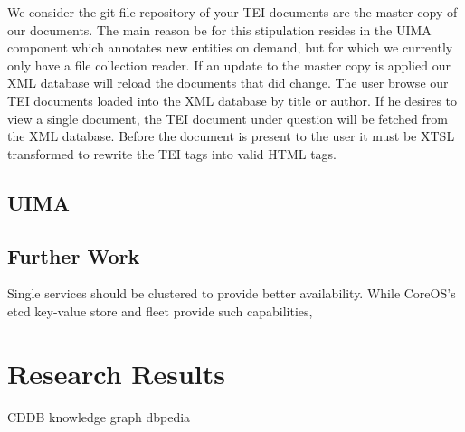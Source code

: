 \documentclass[12pt, draft]{article}
\begin{document}
We consider the git file repository of your TEI documents are the master copy
of our documents.  The main reason be for this stipulation resides in the
UIMA component which annotates new entities on demand, but for which we
currently only have a file collection reader.  If an update to the master copy
is applied our XML database will reload the documents that did change.
The user browse our TEI documents loaded into the XML database by title
or author.  If he desires to view a single document, the TEI document under question
will be fetched from the XML database.  Before the document is present to the
user it must be XTSL transformed to rewrite the TEI tags into valid HTML
tags.  

\subsection{UIMA}

\subsection{Further Work}

Single services should be clustered to provide better availability. While CoreOS's etcd key-value store
and fleet provide such capabilities, 


\section{Research Results}

CDDB
knowledge graph
dbpedia
\end{document}
